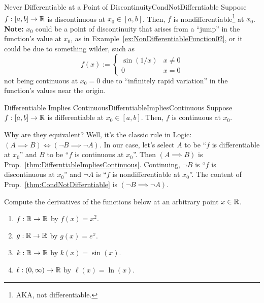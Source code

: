 \begin{propColor}{Never Differentiable at a Point of Discontinuity}{CondNotDifferntiable}
Suppose $f:[a, b] \to \mathbb R$ is discontinuous at $x_0 \in [a, b]$. Then, $f$ is nondifferentiable\footnote{AKA, not differentiable.} at $x_0$. \\

\textbf{Note:} $x_0$ could be a point of discontinuity that arises from a ``jump'' in the function's value at $x_0$, as in Example~\ref{ex:NonDifferentiableFunction02}, or it could be due to something wilder, such as 
$$f(x):=\begin{cases}
    \sin(1/x) & x \neq 0 \\ 0 & x = 0
\end{cases}$$ not being continuous at $x_0=0$ due to ``infinitely rapid variation'' in the function's values near the origin.
\end{propColor}

\bigskip

\begin{propColor}{Differentiable Implies Continuous}{DifferntiableImpliesContinuous}
Suppose $f:[a, b] \to \mathbb R$ is differentiable at $x_0 \in [a, b]$. Then, $f$ is continuous at $x_0$.    
\end{propColor}
\bigskip

Why are they equivalent? Well, it's the classic rule in Logic: $(A \implies B) \iff (\lnot B \implies \lnot A)$. In our case, let's select $A$ to be ``$f$ is differentiable at $x_0$'' and $B$ to be ``$f$ is continuous at $x_0$''. Then $(A \implies B)$ is Prop.~\ref{thm:DifferntiableImpliesContinuous}. Continuing, $\lnot B$ is ``$f$ is discontinuous at $x_0$'' and $\lnot A$ is ``$f$ is nondifferentiable at $x_0$''. The content of Prop.~\ref{thm:CondNotDifferntiable} is $(\lnot B \implies \lnot A)$. \\



\bigskip


\begin{example}
\label{ex:CommonDerivativesUsingDefinition}
Compute the derivatives of the functions below at an arbitrary point $x \in \mathbb R$. 
\begin{enumerate}
\renewcommand{\labelenumi}{(\alph{enumi})}
\setlength{\itemsep}{.2cm}
    \item $f:\mathbb R \to \mathbb R$ by $f(x)= x^2$.
    \item $g:\mathbb R \to \mathbb R$ by $g(x) = e^{x}$.
    \item $k:\mathbb R \to \mathbb R$ by $k(x) = \sin(x)$.
    \item $\ell:(0, \infty) \to \mathbb R$ by $\ell(x) = \ln(x)$.
\end{enumerate}

\end{example}

